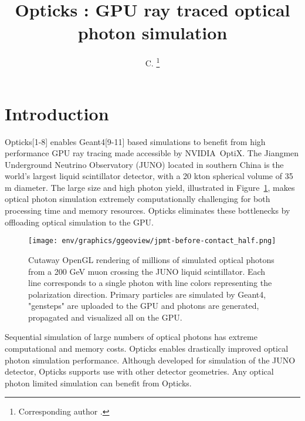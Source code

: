 \documentclass{webofc}
\begin{document}
\title{Opticks : GPU ray traced optical photon simulation}
\author{ C. \fnsep\thanks{Corresponding author .}}
\abstract{}
\maketitle
%
\section{Introduction}%
\label{intro}
%
Opticks[1-8] enables Geant4[9-11] based simulations 
to benefit from high performance GPU ray tracing made accessible 
by NVIDIA\textregistered\ OptiX\texttrademark[12-16].
%
The Jiangmen Underground Neutrino Observatory (JUNO)\cite{juno} 
located in southern China is the world's largest liquid scintillator detector, 
with a 20 kton spherical volume of 35 m diameter. The large size and high photon yield, illustrated in Figure~\ref{problem}, 
makes optical photon simulation extremely computationally challenging for both processing time and memory resources. 
Opticks eliminates these bottlenecks by offloading optical simulation to the GPU. 
%
%
\begin{figure}
\centering
\texttt{[image: env/graphics/ggeoview/jpmt-before-contact\_half.png]}
\caption{Cutaway OpenGL rendering of millions of simulated optical photons from a 200 GeV muon crossing the JUNO liquid scintillator. 
Each line corresponds to a single photon with line colors representing the polarization direction. 
Primary particles are simulated by Geant4, "gensteps" are uploaded to the GPU and photons are generated, propagated
and visualized all on the GPU. 
}
\label{problem}
\vspace{-5mm}
\end{figure}%
%
Sequential simulation of large numbers of 
optical photons has extreme computational and memory costs. 
Opticks enables drastically improved optical photon simulation performance.
%
Although developed for simulation of the JUNO detector, Opticks
supports use with other detector geometries. 
Any optical photon limited simulation can benefit from Opticks.
\end{document}
